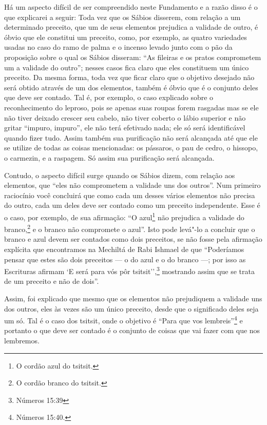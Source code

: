 Há um aspecto difícil de ser compreendido neste Fundamento e a razão
disso é o que explicarei a seguir: Toda vez que os Sábios disserem, com
relação a um determinado preceito, que um de seus elementos prejudica a
validade de outro, é óbvio que ele constitui um preceito, como, por
exemplo, as quatro variedades usadas no caso do ramo de palma e o
incenso levado junto com o pão da proposição sobre o qual os Sábios
disseram: ``As fileiras e os pratos comprometem um a validade do
outro''; nesses casos fica claro que eles constituem um único preceito.
Da mesma forma, toda vez que ficar claro que o objetivo desejado não
será obtido através de um dos elementos, também é óbvio que é o conjunto
deles que deve ser contado. Tal é, por exemplo, o caso explicado sobre o
reconhecimento do leproso, pois se apenas suas roupas forem rasgadas
mas se ele não tiver deixado crescer seu cabelo, não tiver coberto o
lábio superior e não gritar ``impuro, impuro'', ele não terá efetivado
nada; ele só será identificável quando fizer tudo. Assim também sua
purificação não será alcançada até que ele se utilize de todas as coisas
mencionadas: os pássaros, o pau de cedro, o hissopo, o carmezin, e a
raspagem. Só assim sua purificação será alcançada.

Contudo, o aspecto difícil surge quando os Sábios dizem, com relação
aos elementos, que ``eles não comprometem a validade uns dos outros''.
Num primeiro raciocínio você concluirá que como cada um desses vários
elementos não precisa do outro, cada um deles deve ser contado como um
preceito independente. Esse é o caso, por exemplo, de sua afirmação:
``O azul\footnote{O cordão azul do tsitsit\starr.} não prejudica a validade do
branco,\footnote{O cordão branco do tsitsit\starr.} e o branco não compromete o azul''. Isto
pode levá"-lo a concluir que o branco e azul devem ser contados como dois
preceitos, se não fosse pela afirmação explícita que encontramos na
Mechiltá\starr{} de Rabi Ishmael\starr{} de que ``Poderíamos pensar que estes são dois
preceitos --- o do azul e o do branco ---; por isso as Escrituras
afirmam `E será para vós pôr tsitsit\starr'',\footnote{Números 15:39} mostrando
assim que se trata de um preceito e não de dois''.

Assim, foi explicado que mesmo que os elementos não prejudiquem a
validade uns dos outros, eles às vezes são um único preceito, desde que
o significado deles seja um só. Tal é o caso dos tsitsit\starr, onde o
objetivo é ``Para que vos lembreis''\footnote{Números 15:40.} e portanto o que
deve ser contado é o conjunto de coisas que vai fazer com que nos
lembremos.

